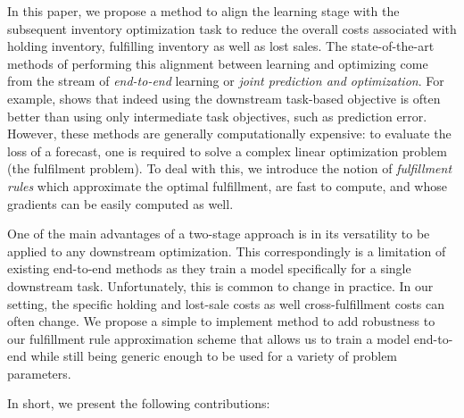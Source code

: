 \documentclass[poms,final,blindrev]{poms1_V1} %
\begin{document}
In this paper, we propose a method to align the learning stage with the subsequent inventory optimization task to reduce the overall costs associated with holding inventory, fulfilling inventory as well as lost sales. The state-of-the-art methods of performing this alignment between learning and optimizing come from the stream of \emph{end-to-end} learning or \emph{joint prediction and optimization}. For example, \cite{cameron2021perils} shows that indeed using the downstream task-based objective is often better than using only intermediate task objectives, such as prediction error. However, these methods are generally computationally expensive: to evaluate the loss of a forecast, one is required to solve a complex linear optimization problem (the fulfilment problem). To deal with this, we introduce the notion of \emph{fulfillment rules} which approximate the optimal fulfillment, are fast to compute, and whose gradients can be easily computed as well. 

One of the main advantages of a two-stage approach is in its versatility to be applied to any downstream optimization. This correspondingly is a limitation of existing end-to-end methods as they train a model specifically for a single downstream task. Unfortunately, this is common to change in practice. In our setting, the specific holding and lost-sale costs as well cross-fulfillment costs can often change.  We propose a simple to implement method to add robustness to our fulfillment rule approximation scheme that allows us to train a model end-to-end while still being generic enough to be used for a variety of problem parameters.

\noindent In short, we present the following contributions:
\end{document}
